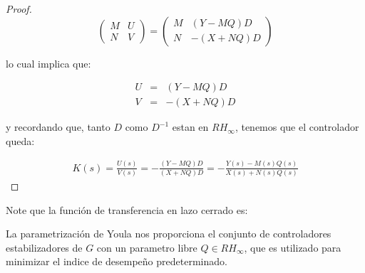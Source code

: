 \begin{proof}
            \begin{equation*}
                \begin{pmatrix}
                    M & U \\
                    N & V
                \end{pmatrix} =
                \begin{pmatrix}
                    M & (Y - MQ)D \\
                    N & -(X + NQ)D
                \end{pmatrix}
            \end{equation*}

            lo cual implica que:

            \begin{eqnarray*}
                U & = & (Y - MQ)D \\
                V & = & -(X + NQ)D
            \end{eqnarray*}

            y recordando que, tanto $D$ como $D^{-1}$ estan en $RH_{\infty}$, tenemos que el controlador queda:

            \begin{eqnarray*}
                K(s) = \frac{U(s)}{V(s)} = - \frac{(Y - MQ)D}{(X + NQ)D} = - \frac{Y(s) - M(s) Q(s)}{X(s) + N(s) Q(s)}
            \end{eqnarray*}
        \end{proof}

        Note que la función de transferencia en lazo cerrado es:



        La parametrización de Youla nos proporciona el conjunto de controladores estabilizadores de $G$ con un parametro libre $Q \in RH_{\infty}$, que es utilizado para minimizar el indice de desempeño predeterminado.
